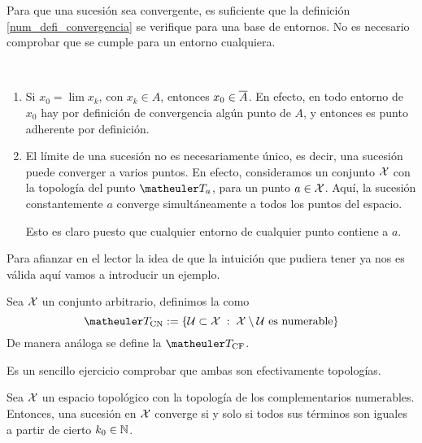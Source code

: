 \begin{obs}[Bases]
	Para que una sucesión sea convergente, es suficiente que la definición \ref{num_defi_convergencia} se verifique para una base de entornos. No es necesario comprobar que se cumple para un entorno cualquiera.
\end{obs}

\begin{obs} \
	\label{num_obs_consecuencias_continuidad}
	\begin{enumerate}
		\item Si $x_0 = \lim x_k$, con $x_k\in A$, entonces $x_0\in\overline{A}$. En efecto, en todo entorno de $x_0$ hay por definición de convergencia algún punto de $A$, y entonces es punto adherente por definición.
		
		\item El límite de una sucesión no es necesariamente único, es decir, una sucesión puede converger a varios puntos. En efecto, consideramos un conjunto $\mathcal{X}$ con la topología del punto $\T_a$, para un punto $a\in\mathcal{X}$. Aquí, la sucesión constantemente $a$ converge simultáneamente a todos los puntos del espacio.
		
		Esto es claro puesto que cualquier entorno de cualquier punto contiene a $a$.\qedhere
	\end{enumerate}
\end{obs}
Para afianzar en el lector la idea de que la intuición que pudiera tener ya nos es válida aquí vamos a introducir un ejemplo.
\begin{defi}[Complementarios]
	Sea $\mathcal{X}$ un conjunto arbitrario, definimos la  como
	\begin{equation*}
		\T_{\text{CN}}:=\{\U\subset \X\midc \X\setminus\U\text{ es numerable}\}
	\end{equation*}
	De manera análoga se define la  $\T_{\text{CF}}$.
	
	Es un sencillo ejercicio comprobar que ambas son efectivamente topologías.
\end{defi}
\begin{lem}
	Sea $\mathcal{X}$ un espacio topológico con la topología de los complementarios numerables. Entonces, una sucesión en $\mathcal{X}$ converge si y solo si todos sus términos son iguales a partir de cierto $k_0\in\mathbb{N}$.
\end{lem}
